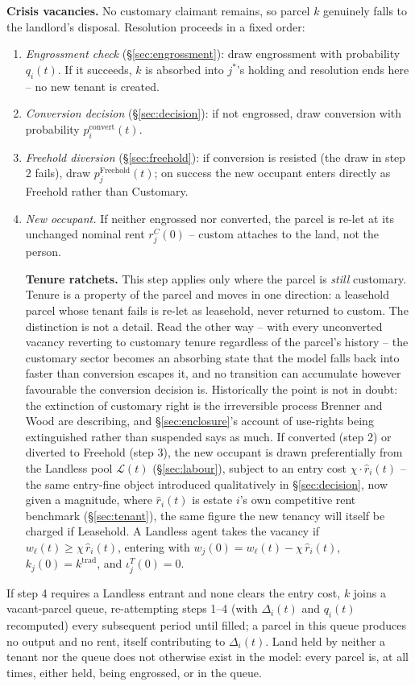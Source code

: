 \documentclass[11pt,english]{article}
\begin{document}
\textbf{Crisis vacancies.} No customary claimant remains, so parcel $k$ genuinely falls to the landlord's disposal. Resolution proceeds in a fixed order:
\begin{enumerate}
\item \emph{Engrossment check} (\S\ref{sec:engrossment}): draw engrossment with probability $q_i(t)$. If it succeeds, $k$ is absorbed into $j^{*}$'s holding and resolution ends here -- no new tenant is created.
\item \emph{Conversion decision} (\S\ref{sec:decision}): if not engrossed, draw conversion with probability $p_i^{\text{convert}}(t)$.
\item \emph{Freehold diversion} (\S\ref{sec:freehold}): if conversion is resisted (the draw in step 2 fails), draw $p_j^{\text{Freehold}}(t)$; on success the new occupant enters directly as Freehold rather than Customary.
\item \emph{New occupant.} If neither engrossed nor converted, the parcel is re-let at its unchanged nominal rent $r_j^{C}(0)$ -- custom attaches to the land, not the person.

\textbf{Tenure ratchets.} This step applies only where the parcel is \emph{still} customary. Tenure is a property of the parcel and moves in one direction: a leasehold parcel whose tenant fails is re-let as leasehold, never returned to custom. The distinction is not a detail. Read the other way -- with every unconverted vacancy reverting to customary tenure regardless of the parcel's history -- the customary sector becomes an absorbing state that the model falls back into faster than conversion escapes it, and no transition can accumulate however favourable the conversion decision is. Historically the point is not in doubt: the extinction of customary right is the irreversible process Brenner and Wood are describing, and \S\ref{sec:enclosure}'s account of use-rights being extinguished rather than suspended says as much. If converted (step 2) or diverted to Freehold (step 3), the new occupant is drawn preferentially from the Landless pool $\mathcal{L}(t)$ (\S\ref{sec:labour}), subject to an entry cost $\chi\cdot\hat r_i(t)$ -- the same entry-fine object introduced qualitatively in \S\ref{sec:decision}, now given a magnitude, where $\hat r_i(t)$ is estate $i$'s own competitive rent benchmark (\S\ref{sec:tenant}), the same figure the new tenancy will itself be charged if Leasehold. A Landless agent takes the vacancy if $w_\ell(t)\geq \chi\, \hat r_i(t)$, entering with $w_j(0)=w_\ell(t)-\chi\, \hat r_i(t)$, $k_j(0)=k^{\text{trad}}$, and $\iota_j^{T}(0)=0$.
\end{enumerate}
If step 4 requires a Landless entrant and none clears the entry cost, $k$ joins a vacant-parcel queue, re-attempting steps 1--4 (with $\Delta_i(t)$ and $q_i(t)$ recomputed) every subsequent period until filled; a parcel in this queue produces no output and no rent, itself contributing to $\Delta_i(t)$. Land held by neither a tenant nor the queue does not otherwise exist in the model: every parcel is, at all times, either held, being engrossed, or in the queue.
\end{document}
